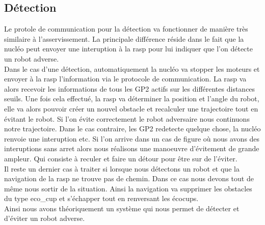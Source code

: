 \documentclass[a4paper,10pt]{report}
\begin{document}
\begin{spacing}{1.5}
\subsection{Détection}
Le protole de communication pour la détection va fonctionner de manière très
similaire à l'asservissement. La principale différence réside dans le fait que
la nucléo peut envoyer une interuption à la rasp pour lui indiquer que l'on
détecte un robot adverse. \\
Dans le cas d'une détection, automatiquement la nucléo va stopper les moteurs et
envoyer à la rasp l'information via le protocole de communication. La rasp va
alors recevoir les informations de tous les GP2 actifs sur les différentes
distances seuils. Une fois cela effectué, la rasp va déterminer la position et
l'angle du robot, elle va alors pouvoir créer un nouvel obstacle et recalculer
une trajectoire tout en évitant le robot. Si l'on évite correctement le robot
adversaire nous continuons notre trajectoire. Dans le cas contraire, les GP2
redetecte quelque chose, la nucléo renvoie une interuption etc. Si l'on arrive
dans un cas de figure où nous avons des interuptions sans arret alors nous
réalisons une manoeuvre d'évitement de grande ampleur. Qui consiste à reculer et
faire un détour pour être sur de l'éviter. \\
Il reste un dernier cas à traiter si lorsque nous détectons un robot et que la
navigation de la rasp ne trouve pas de chemin. Dans ce cas nous devons tout de
même nous sortir de la situation. Ainsi la navigation va supprimer les obstacles
du type eco\_cup et s'échapper tout en renversant les écocups. \\
Ainsi nous avons théoriquement un système qui nous permet de détecter et
d'éviter un robot adverse.

\end{spacing}
\end{document}
